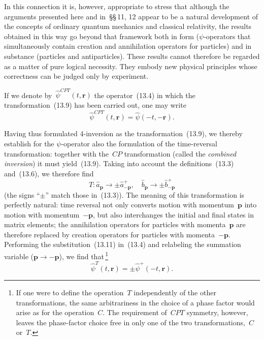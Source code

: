 In this connection it is, however, appropriate to stress that although the arguments presented here and in~\S\S\,11, 12 appear to be a natural development of the concepts of ordinary quantum mechanics and classical relativity, the results obtained in this way go beyond that framework both in form ($\psi$-operators that simultaneously contain creation and annihilation operators for particles) and in substance (particles and antiparticles). These results cannot therefore be regarded as a matter of pure logical necessity. They embody new physical principles whose correctness can be judged only by experiment.

If we denote by~$\hat{\psi}^{CPT}(t,\mathbf{r})$ the operator~(13.4) in which the transformation~(13.9) has been carried out, one may write
\begin{equation}
\hat{\psi}^{CPT}(t,\mathbf{r}) = \hat{\psi}(-t,-\mathbf{r}).
\tag{13.10}
\end{equation}

Having thus formulated 4-inversion as the transformation~(13.9), we thereby establish for the $\psi$-operator also the formulation of the time-reversal transformation: together
with the~$CP$ transformation (called the \emph{combined inversion}) it must yield~(13.9). Taking into account the definitions~(13.3) and~(13.6), we therefore find
\begin{equation}
T:\hat{a}_\mathbf{p} \to \pm\hat{a}^+_{-\mathbf{p}}, \quad \hat{b}_\mathbf{p} \to \pm\hat{b}^+_{-\mathbf{p}}
\tag{13.11}
\end{equation}
(the signs ``$\pm$'' match those in~(13.3)). The meaning of this transformation is perfectly natural: time reversal not only converts motion with momentum~$\mathbf{p}$ into motion with momentum~$-\mathbf{p}$, but also interchanges the initial and final states in matrix elements; the annihilation operators for particles with momenta~$\mathbf{p}$ are therefore replaced by creation operators for particles with momenta~$-\mathbf{p}$. Performing the substitution~(13.11) in~(13.4) and relabeling the summation variable ($\mathbf{p} \to -\mathbf{p}$), we find that\,\footnote{If one were to define the operation~$T$ independently of the other transformations, the same arbitrariness in the choice of a phase factor would arise as for the operation~$C$. The requirement of~$CPT$ symmetry, however, leaves the phase-factor choice free in only one of the two transformations,~$C$ or~$T$.}
\begin{equation}
\hat{\psi}^T(t,\mathbf{r}) = \pm\hat{\psi}^+(-t,\mathbf{r}).
\tag{13.12}
\end{equation}

